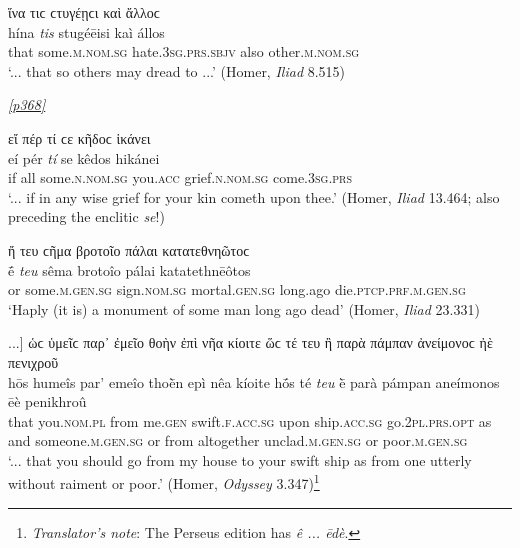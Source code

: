 \begin{exe}
\ex ἵνα τιϲ ϲτυγέῃϲι καὶ ἄλλοϲ\\
\gll hína \emph{tis} stugéēisi kaì állos\\
that some.\textsc{m.nom.sg} hate.\textsc{3sg.prs.sbjv} also other.\textsc{m.nom.sg}\\
\trans `... that so others may dread to ...' (Homer, \textit{Iliad} 8.515)
\label{tis2}
\end{exe}

\hyperlink{p368}{\emph{[p368]}}

\begin{exe}
\ex εἴ πέρ τί ϲε κῆδοϲ ἱκάνει\\
\gll eí pér \emph{tí} se kêdos hikánei\\
if all some.\textsc{n.nom.sg} you.\textsc{acc} grief.\textsc{n.nom.sg}
come.\textsc{3sg.prs}\\
\trans `... if in any wise grief for your kin cometh upon thee.' (Homer, \textit{Iliad} 13.464; also preceding the enclitic \textit{se}!)
\label{tis3}
\end{exe}

\begin{exe}
\ex ἤ τευ ϲῆμα βροτοῖο πάλαι κατατεθνηῶτοϲ\\
\gll ḗ \emph{teu} sêma brotoîo pálai katatethnēôtos\\
or some.\textsc{m.gen.sg} sign.\textsc{nom.sg} mortal.\textsc{gen.sg} long.ago die.\textsc{ptcp.prf.m.gen.sg}\\
\trans `Haply (it is) a monument of some man long ago dead' (Homer, \textit{Iliad} 23.331)
\label{tis4}
\end{exe}

\largerpage[2]
\begin{exe}
\ex {[}...{]} ὡϲ ὑμεῖϲ παρ᾽ ἐμεῖο θοὴν ἐπὶ νῆα κίοιτε ὥϲ τέ τευ ἢ παρὰ πάμπαν ἀνείμονοϲ ἠὲ πενιχροῦ\\
\gll hōs humeîs par' emeîo thoḕn epì nêa kíoite hṓs té \emph{teu} ḕ parà pámpan aneímonos ēè penikhroû\\
that you.\textsc{nom.pl} from me.\textsc{gen} swift.\textsc{f.acc.sg} upon ship.\textsc{acc.sg} go.\textsc{2pl.prs.opt} as and someone.\textsc{m.gen.sg} or from altogether unclad.\textsc{m.gen.sg} or poor.\textsc{m.gen.sg}\\
\trans `... that you should go from my house to your swift ship as from one utterly without raiment or poor.' (Homer, \textit{Odyssey} 3.347)\footnote{\emph{Translator's note}: The Perseus edition
has \textit{ê ... ēdè}.}
\label{tis5}
\end{exe}
\clearpage

